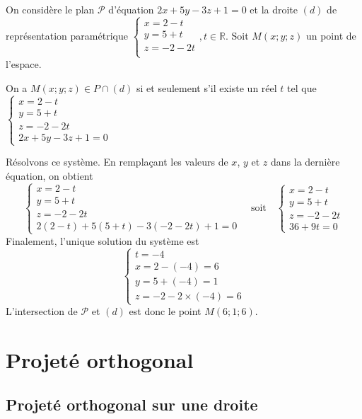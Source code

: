 \documentclass[11pt,fleqn, openany]{book} %
\begin{document}
\begin{example}On considère le plan $\mathcal{P}$ d'équation $2x+5y-3z+1=0$ et la droite $(d)$ de représentation paramétrique  $\left\{ \begin{array}{l}x=2-t \\ y=5+t \\ z = -2-2t \\\end{array}\right., t \in \mathbb{R}$. Soit $M(x;y;z)$ un point de l'espace.

On a $M(x;y;z)\in P \cap (d)$ si et seulement s'il existe un réel  $t$ tel que $\left\{ \begin{array}{l}x=2-t \\ y=5+t \\ z = -2-2t \\2x+5y-3z+1=0 \end{array}\right.$

Résolvons ce système. En remplaçant les valeurs de $x$, $y$ et $z$ dans la dernière équation, on obtient
\[ \left\{ \begin{array}{l}x=2-t \\ y=5+t \\ z = -2-2t \\2(2-t)+5(5+t)-3(-2-2t)+1=0 \end{array}\right.\quad  \text{soit}\quad \left\{ \begin{array}{l}x=2-t \\ y=5+t \\ z = -2-2t \\36+9t=0 \end{array}\right.\]
Finalement, l'unique solution du système est
\[ \left\{ \begin{array}{l}t=-4 \\x=2-(-4)=6 \\ y=5+(-4)=1 \\ z = -2-2 \times (-4)=6 \end{array}\right.\]
L'intersection de $\mathcal{P}$ et $(d)$ est donc le point $M(6;1;6)$.\end{example}



\section{Projeté orthogonal}

\subsection{Projeté orthogonal sur une droite}
\end{document}
